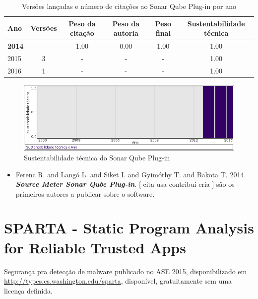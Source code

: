 \begin{table}[H]
\caption{Versões lançadas e número de citações ao Sonar Qube Plug-in por ano}
\centering
\begin{tabular}{| l | c | c | c | c | c |}
  \hline
  Ano & Versões & Peso da citação & Peso da autoria & Peso final & Sustentabilidade técnica \\
  \hline
            {\bf 2014}
          &
          
          &
          1.00
          &
          0.00
          &
          1.00
          &
            {\color{blue} 1.00}
          \\
\hline
        2015 & 3 & - & - & -
        &
          {\color{blue} 1.00}
        \\
\hline
        2016 & 1 & - & - & -
        &
          {\color{blue} 1.00}
        \\
\hline
\end{tabular}
\end{table}

\begin{figure}[h]
  \center
  \includegraphics[scale=0.50]{result-documents/charts/sonarqube-plugin.png}
  \caption{Sustentabilidade técnica do Sonar Qube Plug-in}
\end{figure}


\begin{itemize}
\item Ferenc R. and Langó L. and Siket I. and Gyimóthy T. and Bakota T.
      2014.
        \textbf{\textit{ Source Meter Sonar Qube Plug-in}}.
      [
          cita
          usa
          contribui
          cria
      ]
são os primeiros autores a publicar sobre o software.
\end{itemize}
\section{SPARTA - Static Program Analysis for Reliable Trusted Apps}

Segurança pra detecção de malware
publicado no ASE 2015,
disponibilizado em \url{http://types.cs.washington.edu/sparta},
disponível,
gratuitamente
sem uma licença definida.


